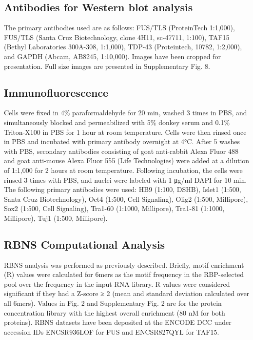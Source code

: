 \subsection{Antibodies for Western blot analysis}
The primary antibodies used are as follows: FUS/TLS (ProteinTech 1:1,000), FUS/TLS (Santa Cruz Biotechnology, clone 4H11, sc-47711, 1:100), TAF15 (Bethyl Laboratories 300A-308, 1:1,000), TDP-43 (Proteintech, 10782, 1:2,000), and GAPDH (Abcam, AB8245, 1:10,000). Images have been cropped for presentation. Full size images are presented in Supplementary Fig. 8.

\subsection{Immunofluorescence}
Cells were fixed in 4\% paraformaldehyde for 20 min, washed 3 times in PBS, and simultaneously blocked and permeabilized with 5\% donkey serum and 0.1\% Triton-X100 in PBS for 1 hour at room temperature. Cells were then rinsed once in PBS and incubated with primary antibody overnight at 4°C. After 5 washes with PBS, secondary antibodies consisting of goat anti-rabbit Alexa Fluor 488 and goat anti-mouse Alexa Fluor 555 (Life Technologies) were added at a dilution of 1:1,000 for 2 hours at room temperature. Following incubation, the cells were rinsed 3 times with PBS, and nuclei were labeled with 1 μg/ml DAPI for 10 min. The following primary antibodies were used: HB9 (1:100, DSHB), Islet1 (1:500, Santa Cruz Biotechnology), Oct4 (1:500, Cell Signaling), Olig2 (1:500, Millipore), Sox2 (1:500, Cell Signaling), Tra1-60 (1:1000, Millipore), Tra1-81 (1:1000, Millipore), Tuj1 (1:500, Millipore).

\subsection{RBNS Computational Analysis}
RBNS analysis was performed as previously described\cite{Conway2016}. Briefly, motif enrichment (R) values were calculated for 6mers as the motif frequency in the RBP-selected pool over the frequency in the input RNA library. R values were considered significant if they had a Z-score ≥ 2 (mean and standard deviation calculated over all 6mers). Values in Fig. 2 and Supplementary Fig. 2 are for the protein concentration library with the highest overall enrichment (80 nM for both proteins). RBNS datasets have been deposited at the ENCODE DCC under accession IDs ENCSR936LOF for FUS and ENCSR827QYL for TAF15.


